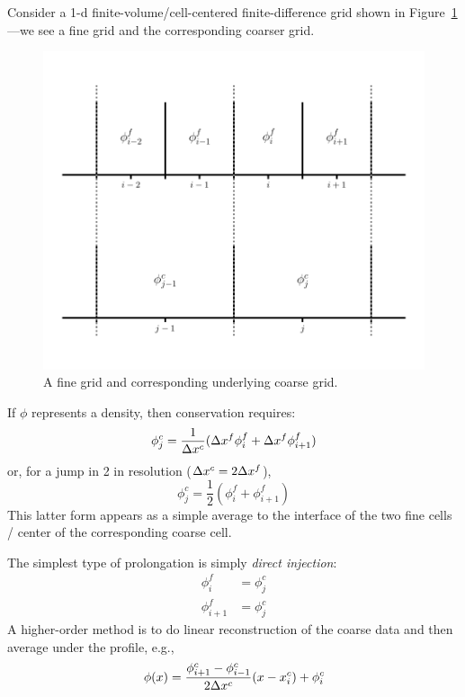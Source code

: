 Consider a 1-d finite-volume/cell-centered finite-difference grid
shown in Figure~\ref{fig:mg:1dgrid-prolong}---we see a fine grid and the
corresponding coarser grid.
%
\begin{figure}[t]
\centering
\includegraphics[width=0.8\linewidth]{fvrestrict}
\caption[The geometry for 1-d
  prolongation and restriction]{\label{fig:mg:1dgrid-prolong} A fine grid and
  corresponding underlying coarse grid.}
\end{figure}
%
If $\phi$ represents a density, then
conservation requires:
\begin{equation}
\phi^c_j = \frac{1}{\Delta x^c} (\Delta x^f \phi^f_i + \Delta x^f \phi^f_{i+1} )
\end{equation}
or, for a jump in 2 in resolution ($\Delta x^c = 2 \Delta x^f$), 
\begin{equation}
\phi^c_j = \frac{1}{2} (\phi^f_i + \phi^f_{i+1} )
\end{equation}
This latter form appears as a simple average to the interface of the
two fine cells / center of the corresponding coarse cell.

The simplest type of 
prolongation is simply {\em direct injection}:
\begin{align}
\phi^f_i &= \phi^c_j \\
\phi^f_{i+1} &= \phi^c_j 
\end{align}
A higher-order method is to do linear reconstruction of the coarse
data and then average under the profile, e.g., 
\begin{equation}
\phi(x) = \frac{\phi^c_{i+1} - \phi^c_{i-1}}{2\Delta x^c} (x - x_i^c) + \phi_i^c
\end{equation}

